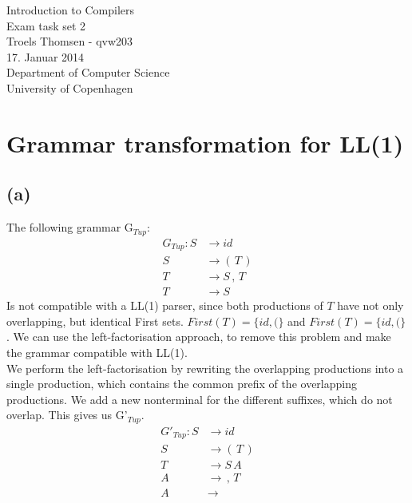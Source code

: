 \documentclass[12pt]{article}
\begin{document}
\begin{titlepage}
    \vspace*{\fill}
    \begin{center}
      {\Huge Introduction to Compilers}\\[0.7cm]
      {\Large Exam task set 2}\\[0.4cm]
      {\large Troels Thomsen - qvw203}\\[0.4cm]
      {\small 17. Januar 2014}\\[0.3cm] 
      {\small Department of Computer Science}\\
      {\small University of Copenhagen}
    \end{center}
    \vspace*{\fill}
\end{titlepage}

\clearpage

\pagebreak

\tableofcontents

\pagebreak

\section{Grammar transformation for LL(1)} 
    
\subsection{(a)}

The following grammar G$_{Tup}$:
\begin{align}
    G_{Tup}: S & \rightarrow id \\
          S & \rightarrow ( \, T \, ) \\
          T & \rightarrow S \, , \, T \\
          T & \rightarrow S
\end{align}
Is not compatible with a LL(1) parser, since both productions of $T$ have not only overlapping, but identical First sets. $First(T) = \{id, (\}$ and $First(T) = \{id, ( \}$. We can use the left-factorisation approach, to remove this problem and make the grammar compatible with LL(1).\\

We perform the left-factorisation by rewriting the overlapping productions into a single production, which contains the common prefix of the overlapping productions. We add a new nonterminal for the different suffixes, which do not overlap. This gives us G'$_{Tup}$.
\begin{align}
    G'_{Tup}: S & \rightarrow id \\
           S & \rightarrow ( \, T \, ) \\
           T & \rightarrow S \, A \\
           A & \rightarrow \, , \, T \\
           A & \rightarrow
\end{align}
\end{document}
